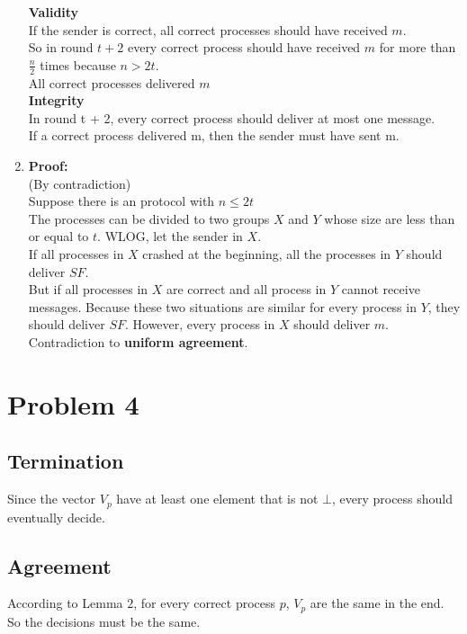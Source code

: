 \documentclass[12pt]{article}
\begin{document}
\begin{enumerate}
\textbf{Validity}\\

If the sender is correct, all correct processes should have received $m$.\\
So in round $t + 2$ every correct process should have received $m$ for more than $\frac{n}{2}$ times because $n>2t$.\\
All correct processes delivered $m$\\

\textbf{Integrity}\\

In round t + 2, every correct process should deliver at most one message.\\
If a correct process delivered m, then the sender must have sent m.\\

\item
\textbf{\large Proof:}\\

(By contradiction)\\
Suppose there is an protocol with $n\leq 2t$\\
The processes can be divided to two groups $X$ and $Y$ whose size are less than or equal to $t$. WLOG, let the sender in $X$.\\
If all processes in $X$ crashed at the beginning, all the processes in $Y$ should deliver $SF$.\\
But if all processes in $X$ are correct and all process in $Y$ cannot receive messages. Because these two situations are similar for every process in $Y$, they should deliver $SF$. However, every process in $X$ should deliver $m$.\\
Contradiction to \textbf{uniform agreement}.\\
\end{enumerate}

\section*{Problem 4}

\subsection*{Termination}
Since the vector $V_p$ have at least one element that is not $\bot$, every process should eventually decide.\\

\subsection*{Agreement}
According to Lemma $2$, for every correct process $p$, $V_p$ are the same in the end. So the decisions
must be the same.
\end{document}
